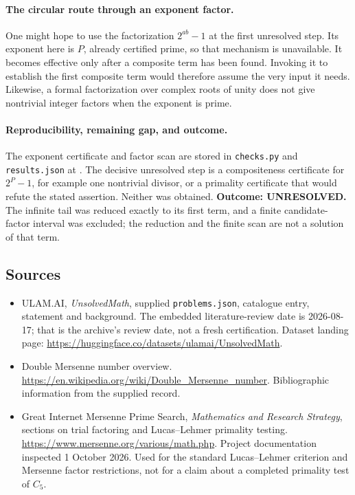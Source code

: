 \documentclass[11pt,a4paper]{article}
\begin{document}
\paragraph{The circular route through an exponent factor.}
One might hope to use the factorization $2^{ab}-1$ at the first
unresolved step. Its exponent here is $P$, already certified prime,
so that mechanism is unavailable. It becomes effective only after a
composite term has been found. Invoking it to establish the first
composite term would therefore assume the very input it needs.
Likewise, a formal factorization over complex roots of unity does not
give nontrivial integer factors when the exponent is prime.

\paragraph{Reproducibility, remaining gap, and outcome.}
The exponent certificate and factor scan are stored in
\texttt{checks.py} and \texttt{results.json} at
.
The decisive unresolved step is a compositeness certificate for
$2^P-1$, for example one nontrivial divisor, or a primality certificate
that would refute the stated assertion. Neither was obtained.
\textbf{Outcome: UNRESOLVED.} The infinite tail was reduced exactly to
its first term, and a finite candidate-factor interval was excluded;
the reduction and the finite scan are not a solution of that term.

\subsection{Sources}

{\small

\begin{itemize}

\item[\hypertarget{source:statement:1}{S1}] ULAM.AI, \emph{UnsolvedMath}, supplied \texttt{problems.json}, catalogue entry, statement and background. The embedded literature-review date is 2026-08-17; that is the archive’s review date, not a fresh certification. Dataset landing page: \url{https://huggingface.co/datasets/ulamai/UnsolvedMath}.

\item[\hypertarget{source:statement:2}{S2}] Double Mersenne number overview. \url{https://en.wikipedia.org/wiki/Double_Mersenne_number}. Bibliographic information from the supplied record.


\item[E1] Great Internet Mersenne Prime Search,
\emph{Mathematics and Research Strategy}, sections on trial factoring
and Lucas--Lehmer primality testing.
\url{https://www.mersenne.org/various/math.php}.
Project documentation inspected 1 October 2026. Used for the standard
Lucas--Lehmer criterion and Mersenne factor restrictions, not for a
claim about a completed primality test of $C_5$.

\end{itemize}

}

\label{end:statement}
\end{document}
